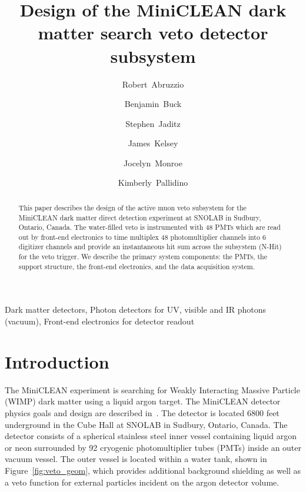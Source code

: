 \documentclass[review,number,sort&compress]{elsarticle}
\begin{document}
\begin{frontmatter}
\title{Design of the MiniCLEAN dark matter search veto detector subsystem}
\author[mit]{Robert~Abruzzio}
\author[mit]{Benjamin~Buck}
\author[lanl]{Stephen~Jaditz}
\author[mit]{James~Kelsey}
\author[rhul]{Jocelyn~Monroe}
\author[sno]{Kimberly~Pallidino}
\address[lanl]{Los Alamos National Laboratory, Los Alamos, NM, USA}
\address[mit]{Massachusetts Institute of Technology, Cambridge, MA, USA}
\address[rhul]{Royal Holloway University of London, Egham, Surrey, UK}
\address[sno]{SNOLAB, Lively, Ontario, CA}
%
\begin{abstract}
This paper describes the design of the active muon veto subsystem for
the MiniCLEAN dark matter direct detection experiment at SNOLAB in Sudbury,
Ontario, Canada. The water-filled veto is instrumented with 48 PMTs which are
read out by front-end electronics to time multiplex 48 photomultiplier channels
into 6 digitizer channels and provide an instantaneous hit sum across the
subsystem (N-Hit) for the veto trigger. We describe the primary system components:
the PMTs, the support structure, the front-end electronics, and the data acquisition system.
\end{abstract}
\begin{keyword}
Dark matter detectors, Photon detectors for UV, visible and IR photons (vacuum), Front-end electronics for detector readout
\end{keyword}
\end{frontmatter}
\linenumbers
%
\section{Introduction}
\label{Introduction}
The MiniCLEAN experiment is searching for Weakly Interacting Massive Particle
(WIMP) dark matter using a liquid argon target. The MiniCLEAN detector
physics goals and design are described in~\cite{ref:miniclean_physics}. The
detector is located 6800 feet underground in the Cube Hall at SNOLAB in
Sudbury, Ontario, Canada. The detector consists of a spherical stainless
steel inner vessel containing liquid argon or neon surrounded by 92 cryogenic
photomultiplier tubes (PMTs) inside an outer vacuum vessel. The outer vessel
is located within a water tank, shown in Figure~\ref{fig:veto_geom}, which
provides additional background shielding as well as a veto function for
external particles incident on the argon detector volume. 
\end{document}
